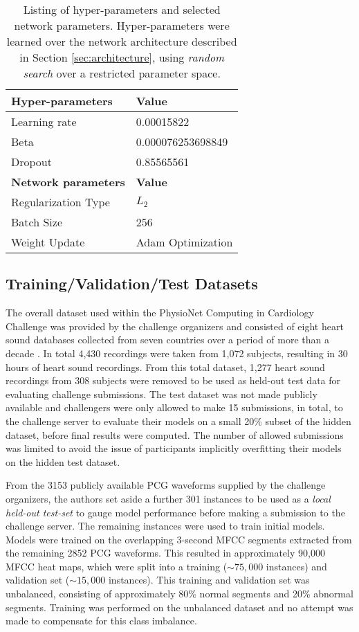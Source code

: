 \documentclass{article}
\begin{document}
\begin{table}
  \centering
  \begin{tabular}{|l|l|}
    \hline
	\bf{Hyper-parameters} & \bf{Value}\\
	\hline
     	Learning rate & 0.00015822\\
     	\hline
	Beta & 0.000076253698849\\
     	\hline
	Dropout & 0.85565561\\	
     	\hline
	\bf{Network parameters} & \bf{Value}\\
	\hline
     	Regularization Type & $L_2$\\
     	\hline
	Batch Size & 256\\
     	\hline
	Weight Update & Adam Optimization\\		
    \hline
	\end{tabular}
  \caption{Listing of hyper-parameters and selected network parameters. Hyper-parameters were learned over the network architecture described in Section \ref{sec:architecture}, using \emph{random search} over a restricted parameter space.}
  \label{tab:hyperparameters}
\end{table}

\subsection{Training/Validation/Test Datasets}

The overall dataset used within the PhysioNet Computing in Cardiology Challenge was provided by the challenge organizers and consisted of eight heart sound databases collected from seven countries over a period of more than a decade \cite{clifford2016classification}. In total 4,430 recordings were taken from 1,072 subjects, resulting in 30 hours of heart sound recordings. From this total dataset, 1,277 heart sound recordings from 308 subjects were removed to be used as held-out test data for evaluating challenge submissions. The test dataset was not made publicly available and challengers were only allowed to make 15 submissions, in total, to the challenge server to evaluate their models on a small 20\% subset of the hidden dataset, before final results were computed. The number of allowed submissions was limited to avoid the issue of participants implicitly overfitting their models on the hidden test dataset. 

From the 3153 publicly available PCG waveforms supplied by the challenge organizers, the authors set aside a further 301 instances to be used as a \emph{local held-out test-set} to gauge model performance before making a submission to the challenge server. The remaining instances were used to train initial models. Models were trained on the overlapping 3-second MFCC segments extracted from the remaining 2852 PCG waveforms. This resulted in approximately 90,000 MFCC heat maps, which were split into a training ($\sim75,000$ instances) and validation set ($\sim15,000$ instances). This training and validation set was unbalanced, consisting of approximately 80\% normal segments and 20\% abnormal segments. Training was performed on the unbalanced dataset and no attempt was made to compensate for this class imbalance.
\end{document}
